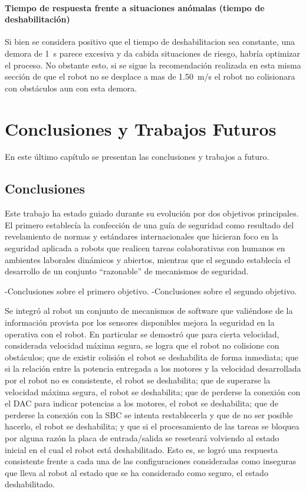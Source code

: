 \documentclass[withindex,glossary]{cam-thesis}
\begin{document}
\subsubsection{Tiempo de respuesta frente a situaciones anómalas (tiempo de deshabilitación)}
Si bien se considera positivo que el tiempo de deshabilitacion sea constante, una demora de \SI{1}{\second} parece excesiva y da cabida situaciones de riesgo, habría optimizar el proceso. No obstante esto, si se sigue la recomendación realizada en esta misma sección de que el robot no se desplace a mas de \SI{1.50}{\metre/\second} el robot no colisionara con obstáculos aun con esta demora.

\chapter{Conclusiones y Trabajos Futuros}

En este último capítulo se presentan las conclusiones y trabajos a futuro.

\section{Conclusiones}
Este trabajo ha estado guiado durante su evolución por dos objetivos principales. El primero establecía la confección de una guía de seguridad como resultado del revelamiento de normas y estándares internacionales que hicieran foco en la seguridad aplicada a robots que realicen tareas colaborativas con humanos en ambientes laborales dinámicos y abiertos, mientras que el segundo establecía el desarrollo de un conjunto ``razonable'' de mecanismos de seguridad.

-Conclusiones sobre el primero objetivo.
-Conclusiones sobre el segundo objetivo.

Se integró al robot un conjunto de mecanismos de software que valiéndose de la información provista por los sensores disponibles mejora la seguridad en la operativa con el robot. En particular se demostró que para cierta velocidad, considerada velocidad máxima segura, se logra que el robot no colisione con obstáculos; que de existir colisión el robot se deshabilita de forma inmediata; que si la relación entre la potencia entregada a los motores y la velocidad desarrollada por el robot no es consistente, el robot se deshabilita; que de superarse la velocidad máxima segura, el robot se deshabilita; que de perderse la conexión con el DAC para indicar potencias a los motores, el robot se deshabilita; que de perderse la conexión con la SBC se intenta restablecerla y que de no ser posible hacerlo, el robot se deshabilita; y que si el procesamiento de las tareas se bloquea por alguna razón la placa de entrada/salida se reseteará volviendo al estado inicial en el cual el robot está deshabilitado. Esto es, se logró una respuesta consistente frente a cada una de las configuraciones consideradas como inseguras que lleva al robot al estado que se ha considerado como seguro, el estado deshabilitado.
\end{document}
